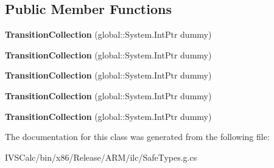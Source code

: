 \subsection*{Public Member Functions}
\begin{DoxyCompactItemize}
\item 
\mbox{\label{class_windows_1_1_u_i_1_1_xaml_1_1_media_1_1_animation_1_1_transition_collection_a572f8c766733135af151366f4a5f8738}} 
{\bfseries Transition\+Collection} (global\+::\+System.\+Int\+Ptr dummy)
\item 
\mbox{\label{class_windows_1_1_u_i_1_1_xaml_1_1_media_1_1_animation_1_1_transition_collection_a572f8c766733135af151366f4a5f8738}} 
{\bfseries Transition\+Collection} (global\+::\+System.\+Int\+Ptr dummy)
\item 
\mbox{\label{class_windows_1_1_u_i_1_1_xaml_1_1_media_1_1_animation_1_1_transition_collection_a572f8c766733135af151366f4a5f8738}} 
{\bfseries Transition\+Collection} (global\+::\+System.\+Int\+Ptr dummy)
\item 
\mbox{\label{class_windows_1_1_u_i_1_1_xaml_1_1_media_1_1_animation_1_1_transition_collection_a572f8c766733135af151366f4a5f8738}} 
{\bfseries Transition\+Collection} (global\+::\+System.\+Int\+Ptr dummy)
\item 
\mbox{\label{class_windows_1_1_u_i_1_1_xaml_1_1_media_1_1_animation_1_1_transition_collection_a572f8c766733135af151366f4a5f8738}} 
{\bfseries Transition\+Collection} (global\+::\+System.\+Int\+Ptr dummy)
\end{DoxyCompactItemize}


The documentation for this class was generated from the following file\+:\begin{DoxyCompactItemize}
\item 
I\+V\+S\+Calc/bin/x86/\+Release/\+A\+R\+M/ilc/Safe\+Types.\+g.\+cs\end{DoxyCompactItemize}

